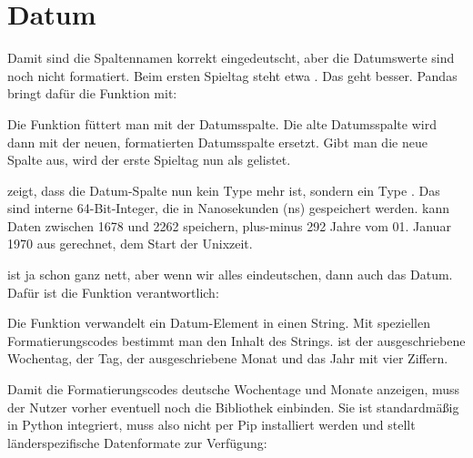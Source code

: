 \section{Datum}

Damit sind die Spaltennamen korrekt eingedeutscht, aber die Datumswerte sind noch nicht formatiert. Beim ersten Spieltag steht etwa . Das geht besser. Pandas bringt dafür die Funktion  mit:

\medskip


\medskip

Die Funktion  füttert man mit der Datumsspalte. Die alte Datumsspalte wird dann mit der neuen, formatierten Datumsspalte ersetzt. Gibt man die neue Spalte aus, wird der erste Spieltag nun als  gelistet.

 zeigt, dass die Datum-Spalte nun kein Type  mehr ist, sondern ein Type . Das sind interne 64-Bit-Integer, die in Nanosekunden (ns) gespeichert werden.  kann Daten zwischen 1678 und 2262 speichern, plus-minus 292 Jahre vom 01. Januar 1970 aus gerechnet, dem Start der Unixzeit.

 ist ja schon ganz nett, aber wenn wir alles eindeutschen, dann auch das Datum. Dafür ist die Funktion  verantwortlich:

\medskip


\medskip


Die Funktion verwandelt ein Datum-Element in einen String. Mit speziellen Formatierungscodes  bestimmt man den Inhalt des Strings.  ist der ausgeschriebene Wochentag,  der Tag,  der ausgeschriebene Monat und  das Jahr mit vier Ziffern.

Damit die Formatierungscodes deutsche Wochentage und Monate anzeigen, muss der Nutzer vorher eventuell noch die Bibliothek  einbinden. Sie ist standardmäßig in Python integriert, muss also nicht per Pip installiert werden und stellt länderspezifische Datenformate zur Verfügung:

\medskip



